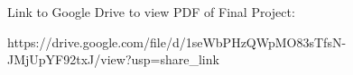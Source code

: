 Link to Google Drive to view PDF of Final Project:

https://drive.google.com/file/d/1seWbPHzQWpMO83sTfsN-JMjUpYF92txJ/view?usp=share_link